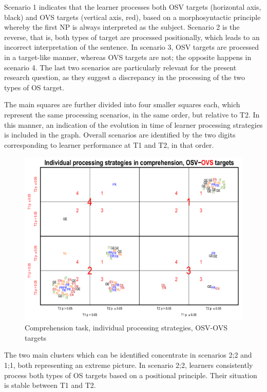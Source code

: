 Scenario 1 indicates that the learner processes both OSV targets (horizontal axis, black) and OVS targets (vertical axis, red), based on a morphosyntactic principle whereby the first NP is always interpreted as the subject. Scenario 2 is the reverse, that is, both types of target are processed positionally, which leads to an incorrect interpretation of the sentence. In scenario 3, OSV targets are processed in a target-like manner, whereas OVS targets are not; the opposite happens in scenario 4. The last two scenarios are particularly relevant for the present research question, as they suggest a discrepancy in the processing of the two types of OS target.

The main squares are further divided into four smaller squares each, which represent the same processing scenarios, in the same order, but relative to T2. In this manner, an indication of the evolution in time of learner processing strategies is included in the graph. Overall scenarios are identified by the two digits corresponding to learner performance at T1 and T2, in that order.

\begin{figure}
    \includegraphics[width=\textwidth]{figures/05-8.pdf}
    \caption{Comprehension task, individual processing strategies, OSV-OVS targets}
    \label{fig:05:8}
\end{figure}

The two main clusters which can be identified concentrate in scenarios 2;2 and 1;1, both representing an extreme picture. In scenario 2;2, learners consistently process both types of OS targets based on a positional principle. Their situation is stable between T1 and T2. 

